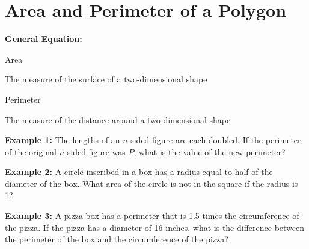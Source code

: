 \section[Polygons]{Area and Perimeter of a Polygon}
\textbf{General Equation:}

\begin{center}
\begin{multicols}{2}
\setlength{\columnseprule}{0pt}
Area

The measure of the surface of a two-dimensional shape

Perimeter

The measure of the distance around a two-dimensional shape
\end{multicols}
\end{center}

\vfill\textbf{Example 1:} The lengths of an $n$-sided figure are each doubled. If the perimeter of the original $n$-sided figure was $P$, what is the value of the new perimeter?

\vfill\textbf{Example 2:} A circle inscribed in a box has a radius equal to half of the diameter of the box. What area of the circle is not in the square if the radius is 1?

\vfill\textbf{Example 3:} A pizza box has a perimeter that is 1.5 times the circumference of the pizza. If the pizza has a diameter of 16 inches, what is the difference between the perimeter of the box and the circumference of the pizza?

